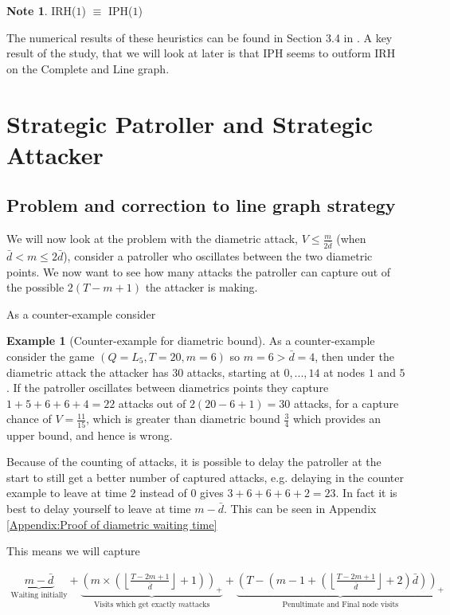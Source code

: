 \documentclass[a4paper,10pt]{article}
\newcommand{\floor}[1]{\left \lfloor #1 \right \rfloor}
\newcommand{\pospart}[1]{\left( #1 \right)_{+}}
\theoremstyle{definition}
\theoremstyle{definition}
\newtheorem{example}[theorem]{Example}
\theoremstyle{remark}
\theoremstyle{definition}
\newtheorem*{note}{Note}
\begin{document}
\begin{note}
IRH($1$) $\equiv$ IPH($1$)
\end{note}

The numerical results of these heuristics can be found in Section 3.4 in \citep{Lin2013}. A key result of the study, that we will look at later is that IPH seems to outform IRH on the Complete and Line graph.

\section{Strategic Patroller and Strategic Attacker}
\label{Section:Strategic Patroller and Strategic Attacker}
\subsection{Problem and correction to line graph strategy}
\label{Subsection:Problem and correction to line graph strategy}
We will now look at the problem with the diametric attack, $V \leq \frac{m}{2\bar{d}}$ (when $\bar{d} < m \leq 2\bar{d}$), consider a patroller who oscillates between the two diametric points. We now want to see how many attacks the patroller can capture out of the possible $2(T-m+1)$ the attacker is making.

As a counter-example consider

\begin{example}[Counter-example for diametric bound]
As a counter-example consider the game $(Q=L_{5},T=20,m=6)$ so $m=6 >\bar{d}=4$, then under the diametric attack the attacker has $30$ attacks, starting at $0,...,14$ at nodes $1$ and $5$. If the patroller oscillates between diametrics points they capture
$1+5+6+6+4=22$ attacks out of $2(20-6+1)=30$ attacks, for a capture chance of $V=\frac{11}{15}$, which is greater than diametric bound $\frac{3}{4}$ which provides an upper bound, and hence is wrong.
\end{example}

Because of the counting of attacks, it is possible to delay the patroller at the start to still get a better number of captured attacks, e.g. delaying in the counter example to leave at time $2$ instead of $0$ gives $3+6+6+6+2=23$. In fact it is best to delay yourself to leave at time $m-\bar{d}$. This can be seen in Appendix \ref{Appendix:Proof of diametric waiting time}

This means we will capture

\begin{align*}
\underbrace{m-\bar{d}}_{\text{Waiting initially}} + \underbrace{\pospart{m \times \left( \floor{\frac{T-2m+1}{\bar{d}}} +1 \right)}}_{\text{Visits which get exactly } m \text{attacks}} + \underbrace{\pospart{T- \left( m-1 + \left(\floor{\frac{T-2m+1}{\bar{d}}} +2 \right) \bar{d} \right)}}_{\text{Penultimate and Final node visits}} 
\end{align*}
\end{document}
